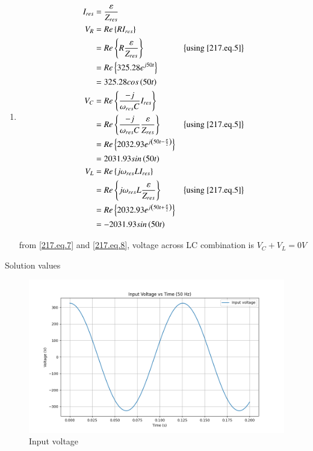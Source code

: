 \documentclass[journal,12pt,twocolumn]{IEEEtran}
\begin{document}
\begin{enumerate}
\item 
\begin{align}
    I_{res} & = \frac{\varepsilon}{Z_{res}}\label{217.eq.5}\\
    V_R & = Re\cbrak{RI_{res}}\\
    & = Re\cbrak{R\frac{\varepsilon}{Z_{res}}}&\cbrak{\text{using \eqref{217.eq.5}}}\\
    & = Re\cbrak{325.28e^{j50t}}\\
    & = 325.28 cos\brak{50t}\\
    V_C & = Re\cbrak{\frac{-j}{\omega_{res}C}I_{res}}\\
    & = Re\cbrak{\frac{-j}{\omega_{res}C}\frac{\varepsilon}{Z_{res}}}&\cbrak{\text{using \eqref{217.eq.5}}}\\
    & = Re\cbrak{2032.93 e^{j\brak{50t - \frac{\pi}{2}}}}\\
    & = 2031.93 sin\brak{50t} \label{217.eq.7}\\
    V_L& = Re\cbrak{j\omega_{res}LI_{res}}\\
    & = Re\cbrak{j\omega_{res}L\frac{\varepsilon}{Z_{res}}}&\cbrak{\text{using \eqref{217.eq.5}}}\\
    & = Re\cbrak{2032.93e^{j\brak{50t + \frac{\pi}{2}}}}\\
    & = - 2031.93 sin\brak{50t} \label{217.eq.8}
\end{align}

from \eqref{217.eq.7} and \eqref{217.eq.8}, voltage across LC combination is $V_C + V_L = 0 V$
\end{enumerate}

\begin{table}[h]
    \centering
    
    \caption{Solution values}
    \label{tab:217.tab.2}
\end{table}

\begin{figure}[h]
     \centering
	\includegraphics[width=\columnwidth]{ncert-physics/12/7/11/figs/Vin.png}
     \caption{Input voltage}
     \label{217.fig.5}
\end{figure}
\end{document}
